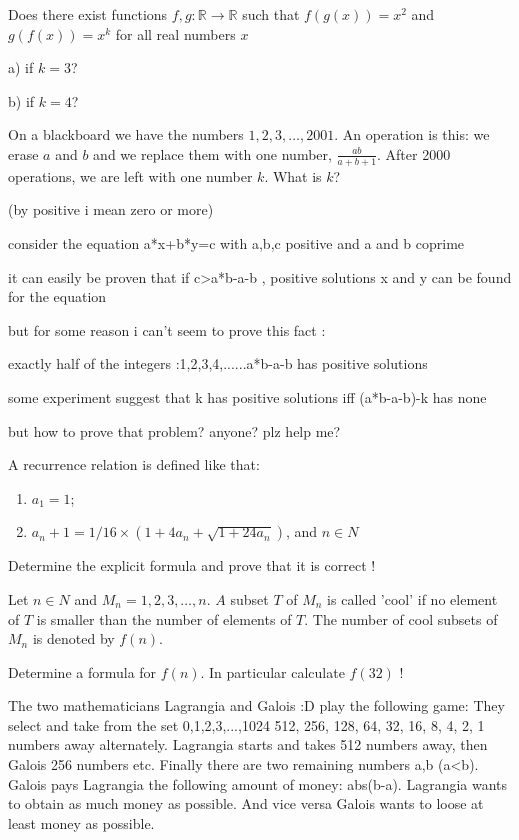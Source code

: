 Does there exist functions $ f,g: \mathbb{R}\to\mathbb{R}$ such that $ f(g(x)) = x^2$ and $ g(f(x)) = x^k$ for all real numbers $ x$

a) if $ k = 3$?

b) if $ k = 4$?
\eq

\bq{}{}
On a blackboard we have the numbers $1, 2, 3, \ldots, 2001$. An operation is this: we erase $a$ and $b$ and we replace them with one number, $\frac{ab}{a+b+1}$. After 2000 operations, we are left with one number $k$. What is $k$?
\eq

\bq{}{}
(by positive i mean zero or more)

consider the equation a*x+b*y=c with a,b,c positive and a and b coprime

it can easily be proven that if c>a*b-a-b , positive solutions x and y can be found for the equation

but for some reason i can't seem to prove this fact :

exactly half of the integers :1,2,3,4,......a*b-a-b has positive solutions

some experiment suggest that k has positive solutions iff (a*b-a-b)-k has none

but how to prove that problem? anyone?
plz help me?
\eq

\bq{}{}
A recurrence relation is defined like that:
\begin{enumerate}[(1)]
 \item $a_1=1$;
 \item $a_n+1 = 1/16 \times (1 + 4a_n + \sqrt{1 + 24a_n})$, 
and $n \in N$
\end{enumerate}

Determine the explicit formula and prove that it is correct !
\eq

\bq{}{}
Let $n \in N$ and $M_n = {1, 2, 3, \ldots, n}$. $A$ subset $T$ of $M_n$ is called 'cool' if no element of $T$ is smaller than the number of elements of $T$. The number of cool subsets of $M_n$ is denoted by $f(n)$.

Determine a formula for $f(n)$. In particular calculate $f(32)$ !
\eq

\bq{}{}
The two mathematicians Lagrangia and Galois :D play the following game:
They select and take from the set {0,1,2,3,...,1024} 512, 256, 128, 64, 32, 16, 8, 4, 2, 1 numbers away alternately. Lagrangia starts and takes 512 numbers away, then Galois 256 numbers etc. Finally there are two remaining numbers a,b (a<b). Galois pays Lagrangia the following amount of money: abs(b-a).
Lagrangia wants to obtain as much money as possible. And vice versa Galois wants to loose at least money as possible.

